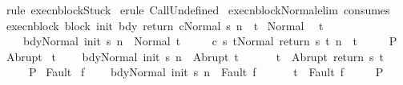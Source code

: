 \begin{isabellebody}
\isamarkupfalse%
\ {\isacharparenleft}rule\ execn{\isacharunderscore}blockStuck{\isacharparenright}\isanewline
{}\isamarkupfalse%
\ {\isacharparenleft}erule\ CallUndefined{\isacharparenright}\isanewline
{}\isamarkupfalse%
%
\endisatagproof
{\isafoldproof}%
%
\isadelimproof
\isanewline
%
\endisadelimproof
\isanewline
{}\isamarkupfalse%
\ execn{\isacharunderscore}block{\isacharunderscore}Normal{\isacharunderscore}elim\ {\isacharbrackleft}consumes\ {}{\isacharbrackright}{\isacharcolon}\isanewline
{}\ execn{\isacharunderscore}block{\isacharcolon}\ {\isachardoublequoteopen}{\isasymGamma}{\isasymturnstile}{\isasymlangle}block\ init\ bdy\ return\ c{\isacharcomma}Normal\ s{\isasymrangle}\ {\isacharequal}n{\isasymRightarrow}\ \ t{\isachardoublequoteclose}\isanewline
{}\ Normal{\isacharcolon}\ \isanewline
\ {\isachardoublequoteopen}{\isasymAnd}t{\isacharprime}{\isachardot}\isanewline
\ \ \ \ {\isasymlbrakk}{\isasymGamma}{\isasymturnstile}{\isasymlangle}bdy{\isacharcomma}Normal\ {\isacharparenleft}init\ s{\isacharparenright}{\isasymrangle}\ {\isacharequal}n{\isasymRightarrow}\ \ Normal\ t{\isacharprime}{\isacharsemicolon}\isanewline
\ \ \ \ \ {\isasymGamma}{\isasymturnstile}{\isasymlangle}c\ s\ t{\isacharprime}{\isacharcomma}Normal\ {\isacharparenleft}return\ s\ t{\isacharprime}{\isacharparenright}{\isasymrangle}\ {\isacharequal}n{\isasymRightarrow}\ \ t{\isasymrbrakk}\isanewline
\ \ \ \ {\isasymLongrightarrow}\ P{\isachardoublequoteclose}\isanewline
{}\ Abrupt{\isacharcolon}\isanewline
\ {\isachardoublequoteopen}{\isasymAnd}t{\isacharprime}{\isachardot}\isanewline
\ \ \ \ {\isasymlbrakk}{\isasymGamma}{\isasymturnstile}{\isasymlangle}bdy{\isacharcomma}Normal\ {\isacharparenleft}init\ s{\isacharparenright}{\isasymrangle}\ {\isacharequal}n{\isasymRightarrow}\ \ Abrupt\ t{\isacharprime}{\isacharsemicolon}\ \isanewline
\ \ \ \ \ t\ {\isacharequal}\ Abrupt\ {\isacharparenleft}return\ s\ t{\isacharprime}{\isacharparenright}{\isasymrbrakk}\isanewline
\ \ \ \ {\isasymLongrightarrow}\ P{\isachardoublequoteclose}\isanewline
{}\ Fault{\isacharcolon}\isanewline
\ {\isachardoublequoteopen}{\isasymAnd}f{\isachardot}\isanewline
\ \ \ \ {\isasymlbrakk}{\isasymGamma}{\isasymturnstile}{\isasymlangle}bdy{\isacharcomma}Normal\ {\isacharparenleft}init\ s{\isacharparenright}{\isasymrangle}\ {\isacharequal}n{\isasymRightarrow}\ \ Fault\ f{\isacharsemicolon}\ \isanewline
\ \ \ \ \ t\ {\isacharequal}\ Fault\ f{\isasymrbrakk}\isanewline
\ \ \ \ {\isasymLongrightarrow}\ P{\isachardoublequoteclose}\isanewline

\end{isabellebody}

